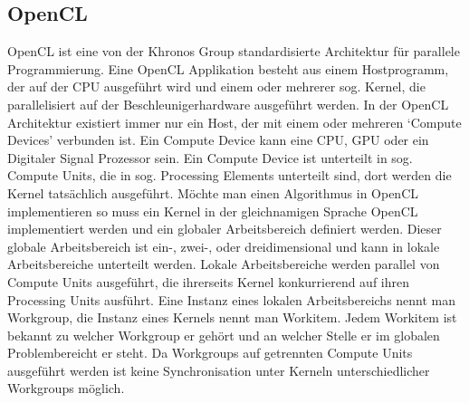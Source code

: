 \documentclass[11pt, ngerman]{article}
\begin{document}
\subsection{OpenCL}
OpenCL ist eine von der Khronos Group standardisierte Architektur f\"ur parallele
Programmierung.\cite{opencl_overview} Eine OpenCL Applikation besteht aus
einem Hostprogramm, der auf der CPU ausgef\"uhrt wird und einem oder mehrerer
sog. Kernel, die parallelisiert auf der Beschleunigerhardware ausgef\"uhrt werden.\cite[p.13]{oclpg_execution_model}
In der OpenCL Architektur existiert immer nur ein Host, der mit einem oder mehreren `Compute Devices' verbunden ist.
Ein Compute Device kann eine CPU, GPU oder ein Digitaler Signal Prozessor sein.
Ein Compute Device ist unterteilt in sog. Compute Units, die in sog. Processing Elements
unterteilt sind, dort werden die Kernel tats\"achlich ausgef\"uhrt.\cite[p.12]{oclpg_execution_model}
M\"ochte man einen Algorithmus in OpenCL implementieren so muss ein Kernel in der gleichnamigen Sprache
OpenCL implementiert werden und ein globaler Arbeitsbereich definiert werden. Dieser globale Arbeitsbereich ist ein-,
zwei-, oder dreidimensional und kann in lokale Arbeitsbereiche unterteilt werden.
Lokale Arbeitsbereiche werden parallel von Compute Units
ausgef\"uhrt, die ihrerseits Kernel konkurrierend auf ihren Processing Units ausf\"uhrt.
Eine Instanz eines lokalen Arbeitsbereichs nennt man Workgroup, die Instanz eines Kernels nennt
man Workitem. Jedem Workitem ist bekannt zu welcher Workgroup er geh\"ort und an welcher Stelle
er im globalen Problembereicht er steht. Da Workgroups auf getrennten Compute Units ausgef\"uhrt
werden ist keine Synchronisation unter Kerneln unterschiedlicher Workgroups m\"oglich.
\newpage
\end{document}
